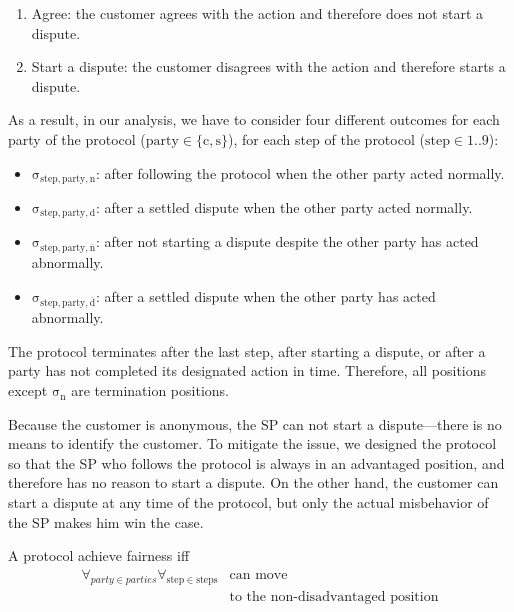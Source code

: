 \begin{enumerate}
\def\labelenumi{\arabic{enumi}.}

\item Agree: the customer agrees with the action and therefore does not start a dispute.
\item Start a dispute: the customer disagrees with the action and therefore starts a dispute.
\end{enumerate}

As a result, in our analysis, we have to consider four different outcomes for each party of the protocol ($\mathrm{party \in \{c, s}\}$), for each step of the protocol ($\mathrm{step \in 1..9}$):

\begin{itemize}

\item
  $\mathrm{\sigma_{step,party,n}}$: after following the protocol when the other party acted normally.
\item
  $\mathrm{\sigma_{step,party,d}}$: after a settled dispute when the other party acted normally.
\item
  $\mathrm{\sigma_{step,party,\overline{n}}}$: after not starting a dispute despite the other party has acted abnormally.
\item
  $\mathrm{\sigma_{step,party,\overline{d}}}$: after a settled dispute when the other party has acted abnormally.
\end{itemize}



The protocol terminates after the last step, after starting a dispute, or after a party has not completed its designated action in time. Therefore, all positions except $\mathrm{\sigma_n}$ are termination positions.

Because the customer is anonymous, the SP can not start a dispute—there is no means to identify the customer. To mitigate the issue, we designed the protocol so that the SP who follows the protocol is always in an advantaged position, and therefore has no reason to start a dispute. On the other hand, the customer can start a dispute at any time of the protocol, but only the actual misbehavior of the SP makes him win the case.

\begin{definition}[Fairness] \label{def:fairness}
A protocol achieve fairness iff 
\begin{equation*}
\begin{split}
\forall_{party \in parties}\forall_{\mathrm{step} \in \mathrm{steps}} &\operatorname{can\ move}\\
&\operatorname{to\ the\ non-disadvantaged\ position} 
\end{split}
\end{equation*}

\end{definition}


